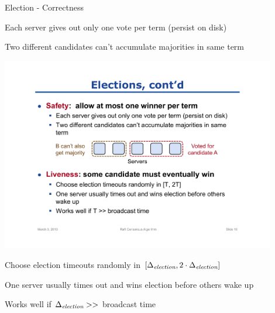 \begin{frame}{Election - Correctness}
	
	\BI
	\item Each server gives out only one vote per term (persist on disk)	
	\item Two different candidates can't accumulate majorities in same term
	\EI
	\begin{center}
	\includegraphics[width=0.9\textwidth]{majority}
	\end{center}

	\BI
	\item Choose election timeouts randomly in $[\Delta_{\textit{election}}, 2 \cdot \Delta_{\textit{election}}]$
	\item One server usually times out and wins election before others wake up
	\item Works well if $\Delta_{\textit{election}} >>$ broadcast time
	\EI

	
\end{frame}

